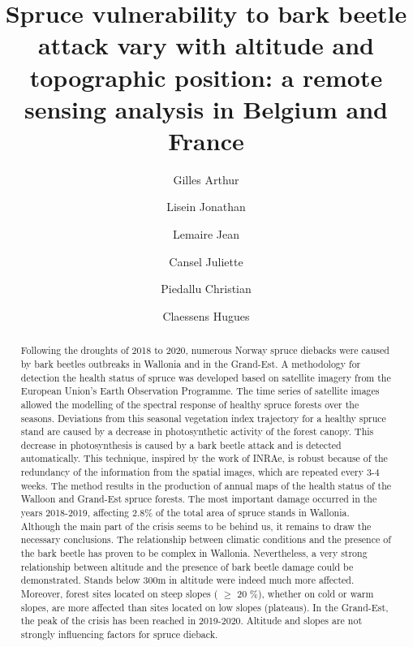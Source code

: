 \documentclass[3p,procedia]{elsarticle}
\begin{document}
\begin{frontmatter}

\author[label1]{Gilles Arthur}
\author[label1]{Lisein Jonathan}
\author[label2]{Lemaire Jean}
\author[label2]{Cansel Juliette}
\author[label3]{Piedallu Christian}
\author[label1]{Claessens Hugues}




\title{Spruce vulnerability to bark beetle attack vary with altitude and topographic position: a remote sensing analysis in Belgium and France}
\begin{abstract}
	
\iffalse
Following the droughts of 2018 to 2020, numerous Norway spruce diebacks were caused by bark beetles 
outbreaks in Wallonia and in the Grand-Est. 
A methodology for detection the health status of spruce was developed based on satellite imagery from the European Union's Earth Observation Programme.
The time series of satellite images allowed the modelling of the spectral response of healthy spruce forests over the seasons. Deviations from this seasonal vegetation index trajectory for a healthy spruce stand are caused by a decrease in photosynthetic activity of the forest canopy.
This decrease in photosynthesis is caused by a bark beetle attack and is detected automatically.
This technique, inspired by the work of INRAe, is robust because of the redundancy of the information from the spatial images, which are repeated every 3-4 weeks. 
The method results in the production of annual maps of the health status of the Walloon and Grand-Est spruce forests.
The most important damage occurred in the years 2018-2019, affecting 2.8\% of the total area of spruce stands in Wallonia.
Although the main part of the crisis seems to be behind us, it remains to draw the necessary conclusions.
The relationship between climatic conditions and the presence of the bark beetle has proven to be complex in Wallonia.
Nevertheless, a very strong relationship between altitude and the presence of bark beetle damage could be demonstrated.
Stands below 300m in altitude were indeed much more affected.
Moreover, forest sites located on steep slopes ( $\ge$  20 \%), whether on cold or warm slopes, are more affected than sites located on low slopes (plateaus).
In the Grand-Est, the peak of the crisis has been reached in 2019-2020. Altitude and slopes are not strongly influencing factors for spruce dieback. 


\end{abstract}
\end{frontmatter}
\end{document}
